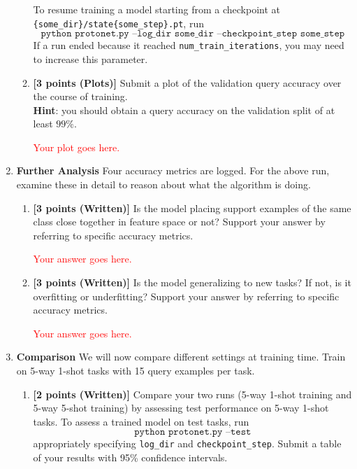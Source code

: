 \documentclass[12pt]{article}
\begin{document}
\begin{enumerate}
\begin{enumerate}[label=(\alph*)]
    To resume training a model starting from a checkpoint at \texttt{\{some\_dir\}/state\{some\_step\}.pt}, run
    \begin{equation*}
        \texttt{python protonet.py --log\_dir some\_dir --checkpoint\_step some\_step}
    \end{equation*}
    If a run ended because it reached \texttt{num\_train\_iterations}, you may need to increase this parameter.
    

    \item \textbf{[3 points (Plots)]} Submit a plot of the validation query accuracy over the course of training. \\
    \textbf{Hint}: you should obtain a query accuracy on the validation split of at least $99\%$.
    
    \textcolor{red}{Your plot goes here.}
        
    \end{enumerate}
    
    \newpage
    \item \textbf{Further Analysis} Four accuracy metrics are logged. For the above run, examine these in detail to reason about what the algorithm is doing.
    \begin{enumerate}[label=(\alph*)]
        \item \textbf{[3 points (Written)]} Is the model placing support examples of the same class close together in feature space or not? Support your answer by referring to specific accuracy metrics.
        
        \textcolor{red}{Your answer goes here.}

        
        \item \textbf{[3 points (Written)]} Is the model generalizing to new tasks? If not, is it overfitting or underfitting? Support your answer by referring to specific accuracy metrics.
        
        \textcolor{red}{Your answer goes here.}

    \end{enumerate}
    
    \newpage
    \item \textbf{Comparison}
    We will now compare different settings at training time. Train on 5-way 1-shot tasks with 15 query examples per task. 
    \begin{enumerate}
        \item  \textbf{[2 points (Written)]} Compare your two runs (5-way 1-shot training and 5-way 5-shot training) by assessing test performance on 5-way 1-shot tasks. To assess a trained model on test tasks, run
        \begin{equation*}
            \texttt{python protonet.py --test}
        \end{equation*}
    appropriately specifying \texttt{log\_dir} and \texttt{checkpoint\_step}. Submit a table of your results with 95\% confidence intervals.
        

\end{enumerate}
\end{enumerate}
\end{document}

